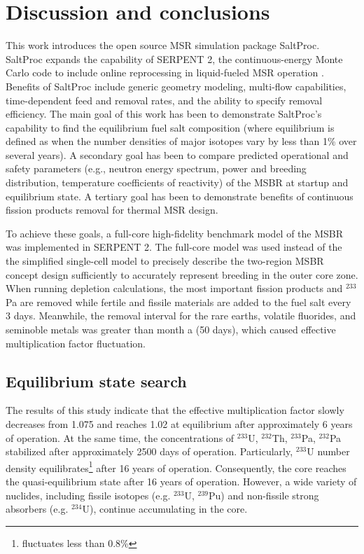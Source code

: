 \section{Discussion and conclusions}

This work introduces the open source \gls{MSR} simulation package SaltProc. 
SaltProc expands the capability of SERPENT 2, the continuous-energy Monte Carlo 
code to include online reprocessing in liquid-fueled \gls{MSR} operation 
\cite{rykhlevskii_arfc/saltproc:_2018}. Benefits of SaltProc include 
generic geometry modeling, multi-flow capabilities, time-dependent feed and 
removal rates, and the ability to specify removal efficiency. The main goal of 
this work has 
been to demonstrate SaltProc's capability to find the equilibrium fuel salt 
composition (where equilibrium is defined as when the number densities of major 
isotopes vary by less than 1\% over several years). A secondary goal has been to 
compare predicted operational and safety parameters (e.g., neutron energy 
spectrum, power and breeding distribution, temperature coefficients of 
reactivity) of the \gls{MSBR} at startup and equilibrium state. A tertiary goal 
has been to demonstrate benefits of continuous fission products removal for 
thermal \gls{MSR} design.

To achieve these goals, a full-core high-fidelity benchmark model of the \gls{MSBR} 
was implemented in SERPENT 2. The full-core model was used instead of the 
the simplified single-cell model \cite{betzler_molten_2017, 
rykhlevskii_online_2017, betzler_fuel_2018} to precisely describe the 
two-region \gls{MSBR} concept design sufficiently to accurately represent 
breeding in the outer core zone. When running depletion calculations, the most 
important fission products and $^{233}$Pa are removed while fertile and fissile 
materials are added to the fuel salt every 3 days.  Meanwhile, the removal 
interval for the rare earths, volatile fluorides, and seminoble metals was greater 
than month a (50 days), which caused effective multiplication factor fluctuation. 

\subsection{Equilibrium state search}
The results of this study indicate that the effective multiplication factor 
slowly decreases from 1.075 and reaches 1.02 at equilibrium after approximately 
6 years of operation. At the same time, the concentrations of $^{233}$U, $^{232}$Th, 
$^{233}$Pa, $^{232}$Pa stabilized after approximately 2500 days of operation. 
Particularly, $^{233}$U number density equilibrates\footnote{fluctuates less 
than 0.8\%} after 16 years of operation. Consequently, the core reaches the quasi-equilibrium state after 16 years of operation. However, a wide variety of nuclides, 
including fissile isotopes (e.g. $^{233}$U, $^{239}$Pu) and non-fissile strong 
absorbers (e.g. $^{234}$U), continue accumulating in the core. %

